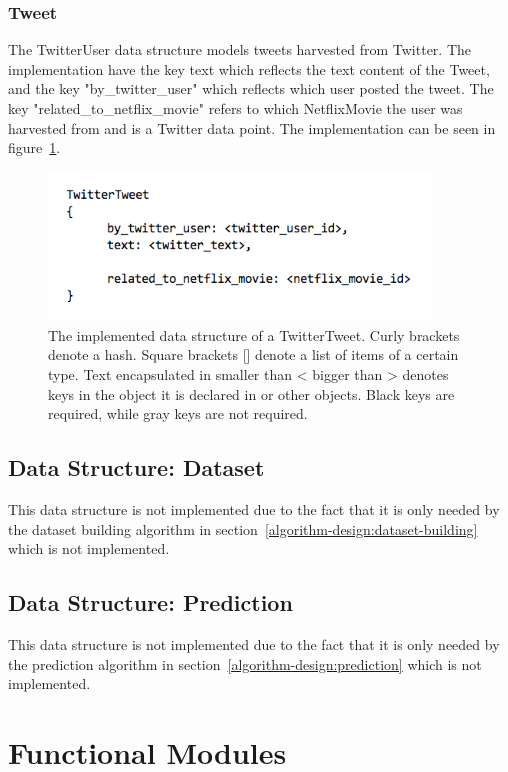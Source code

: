 \subsubsection{Tweet}
The TwitterUser data structure models tweets harvested from Twitter. The implementation have the key text which reflects the text content of the Tweet, and the key "by\_twitter\_user" which reflects which user posted the tweet. The key "related\_to\_netflix\_movie" refers to which NetflixMovie the user was harvested from and is a Twitter data point. The implementation can be seen in figure~\ref{figure:datastructure-twitter-tweet}.

	\begin{figure}[H]
	\includegraphics[width=4in]{image/datastructure-twitter-tweet.png}
	\centering
	\caption{The implemented data structure of a TwitterTweet. Curly brackets {} denote a hash. Square brackets [] denote a list of items of a certain type. Text encapsulated in smaller than < bigger than > denotes keys in the object it is declared in or other objects. Black keys are required, while gray keys are not required.}
	\label{figure:datastructure-twitter-tweet}
	\end{figure}

\subsection{Data Structure: Dataset}
This data structure is not implemented due to the fact that it is only needed by the dataset building algorithm in section~\ref{algorithm-design:dataset-building} which is not implemented.
\subsection{Data Structure: Prediction}
This data structure is not implemented due to the fact that it is only needed by the prediction algorithm in section~\ref{algorithm-design:prediction} which is not implemented.

\section{Functional Modules}\label{impl:Functional Modules}

